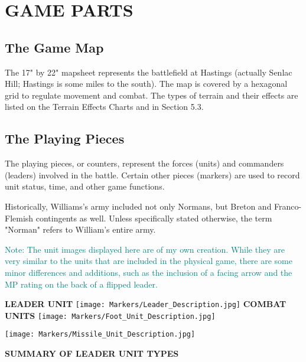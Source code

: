 \section{GAME PARTS}

\subsection{The Game Map}

The 17" by 22" mapsheet represents the battlefield at Hastings (actually Senlac Hill; Hastings is some miles to the south). The map is covered by a hexagonal grid to regulate movement and combat. The types of terrain and their effects are listed on the Terrain Effects Charts and in Section 5.3.

\subsection{The Playing Pieces}

The playing pieces, or counters, represent the forces (units) and commanders (leaders) involved in the battle. Certain other pieces (markers) are used to record unit status, time, and other game functions.

Historically, Williams's army included not only Normans, but Breton and Franco-Flemish contingents as well. Unless specifically stated otherwise, the term "Norman" refers to William's entire army.

\textcolor{teal}{Note: The unit images displayed here are of my own creation. While they are very similar to the units that are included in the physical game, there are some minor differences and additions, such as the inclusion of a facing arrow and the MP rating on the back of a flipped leader.}

\begin{center}
\textbf{LEADER UNIT}
\break
\texttt{[image: Markers/Leader\_Description.jpg]}
\break
\break
\textbf{COMBAT UNITS}
\break
\break
\texttt{[image: Markers/Foot\_Unit\_Description.jpg]}
\par
\texttt{[image: Markers/Missile\_Unit\_Description.jpg]}
\end{center}
\break

\renewcommand\tabularxcolumn[1]{m{#1}}

\par
\begin{center}
  \textbf{SUMMARY OF LEADER UNIT TYPES}
  \break
\end{center}


